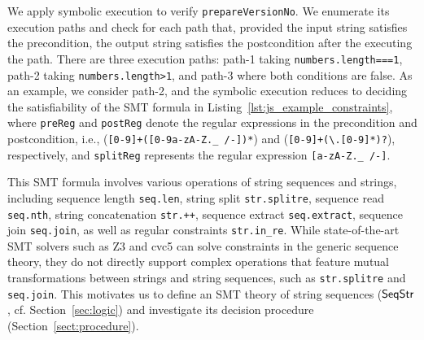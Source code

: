 We apply symbolic execution to verify \texttt{prepareVersionNo}. %
We enumerate its execution paths and check for each path that, provided the input string satisfies the precondition, the output string satisfies the postcondition after the executing the path. 
There are three execution paths: path-1 taking \verb|numbers.length===1|, path-2 taking \verb|numbers.length>1|, and path-3 where both conditions are false.
As an example, we consider path-2, and %
the symbolic execution %
reduces to deciding the satisfiability of the SMT formula in Listing~\ref{lst:js_example_constraints}, where {\tt preReg} and {\tt postReg} denote the regular expressions in the precondition and postcondition, i.e.,
 (\verb|[0-9]+([0-9a-zA-Z._ /-])*|) and (\verb|[0-9]+(\.[0-9]*)?|), respectively, and {\tt splitReg} represents the regular expression \verb|[a-zA-Z._ /-]|. 

This SMT formula involves various operations of string sequences and strings, including sequence length {\tt seq.len}, string split {\tt str.splitre}, sequence read {\tt seq.nth}, string concatenation {\tt str.++},
sequence extract {\tt seq.extract}, sequence join {\tt seq.join}, as well as regular constraints  {\tt str.in\_re}. 
While state-of-the-art SMT solvers such as Z3 and cvc5 can solve constraints in the generic sequence theory, they do not directly support complex operations that feature mutual transformations between strings and string sequences, such as {\tt str.splitre} and {\tt seq.join}. 
This motivates us to define an SMT theory of string sequences (${\sf SeqStr}$, cf. Section~\ref{sec:logic}) and investigate its decision procedure (Section~\ref{sect:procedure}). %


